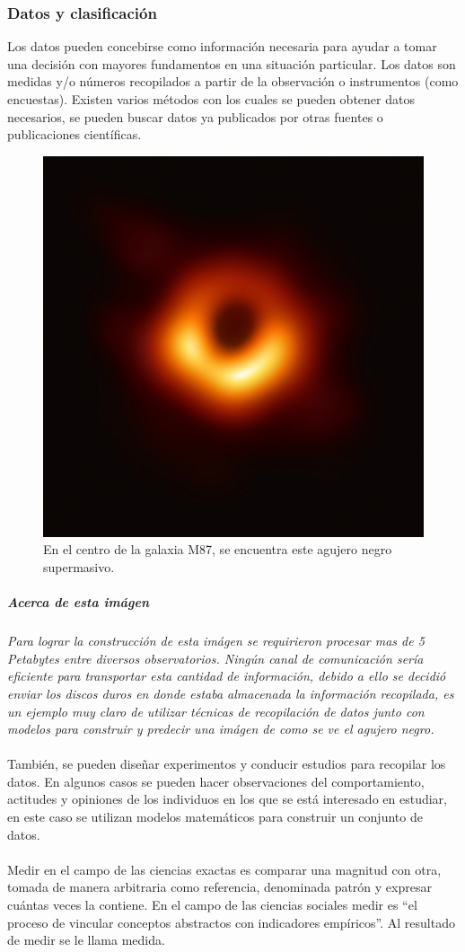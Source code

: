\documentclass[12pt,hidelinks]{article}
\begin{document}
	\subsubsection{Datos y clasificación} Los datos pueden concebirse como información necesaria para ayudar a tomar una decisión con mayores fundamentos en una situación particular. Los datos son medidas y/o números recopilados a partir de la observación o instrumentos (como encuestas).  Existen varios métodos con los cuales se pueden obtener datos necesarios, se pueden buscar datos ya publicados por otras fuentes o publicaciones científicas.
	\begin{figure}[h!]
		\centering
		\includegraphics[width=0.5\linewidth]{images/2/black_hole.jpg}
		\caption[Agujero Negro M87]{En el centro de la galaxia M87, se encuentra este agujero negro supermasivo.}
	\end{figure}
	\subparagraph{Acerca de esta imágen} \textit{Para lograr la construcción de esta imágen se requirieron procesar mas de 5 Petabytes entre diversos observatorios. Ningún canal de comunicación sería eficiente para transportar esta cantidad de información, debido a ello se decidió enviar los discos duros en donde estaba almacenada la información recopilada, es un ejemplo muy claro de utilizar técnicas de recopilación de datos junto con modelos para construir y predecir una imágen de como se ve el agujero negro.}
	\paragraph{}También, se pueden diseñar experimentos y conducir estudios para recopilar los datos. En algunos casos se pueden hacer observaciones del comportamiento, actitudes y opiniones de los individuos en los que se está interesado en estudiar, en este caso se utilizan modelos matemáticos para construir un conjunto de datos.
	\paragraph{} Medir en el campo de las ciencias exactas es comparar una magnitud con otra, tomada de manera arbitraria como referencia, denominada patrón y expresar cuántas veces la contiene. En el campo de las ciencias sociales medir es “el proceso de vincular conceptos abstractos con indicadores empíricos”. Al resultado de medir se le llama medida.
\end{document}
